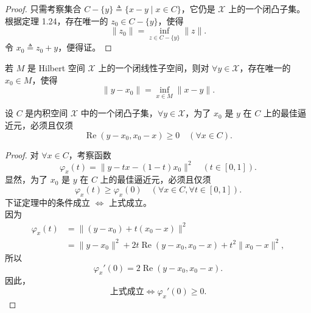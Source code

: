 \documentclass[lang=cn,newtx,10pt,scheme=chinese,thmcnt=chapter]{elegantbook}
\begin{document}
\begin{proof}
只需考察集合 ${C} - \{y\} \triangleq \{x - y \mid x \in {C}\}$，它仍是 $\mathscr{X}$ 上的一个闭凸子集。根据定理 1.24，存在唯一的 $z_0 \in {C} - \{y\}$，使得
\begin{equation*}
\|z_0\| = \inf_{z \in C  - \{y\}} \|z\|.
\end{equation*}
令 $x_0 \triangleq z_0 + y$，便得证。
\end{proof}

\begin{example}
若 $M$ 是 Hilbert 空间 $\mathscr{X}$ 上的一个闭线性子空间，则对 $\forall y \in \mathscr{X}$，存在唯一的 $x_0 \in M$，使得
\begin{equation*}
\|y - x_0\| = \inf_{x \in M} \|x - y\|.
\end{equation*}
\end{example}

\begin{theorem}
设 ${C}$ 是内积空间 $\mathscr{X}$ 中的一个闭凸子集，$\forall y \in \mathscr{X}$，为了 $x_0$ 是 $y$ 在 ${C}$ 上的最佳逼近元，必须且仅须
\begin{equation*}
\operatorname{Re}(y - x_0, x_0 - x) \geqslant 0 \quad (\forall x \in {C}).
\end{equation*}
\end{theorem}

\begin{proof}
对 $\forall x \in C$，考察函数
\begin{equation*}
\varphi_x(t) = \|y - t x - (1 - t) x_0\|^2 \quad (t \in [0, 1]).
\end{equation*}
显然，为了 $x_0$ 是 $y$ 在 $C$ 上的最佳逼近元，必须且仅须
\begin{equation*}
\varphi_x(t) \geqslant \varphi_x(0) \quad (\forall x \in C, \forall t \in [0, 1]).
\end{equation*}
下证定理中的条件成立 $\Longleftrightarrow$ 上式成立。\\
因为
\begin{equation*}
\begin{aligned}
\varphi_x(t) &= \|(y - x_0) + t (x_0 - x)\|^2 \\
&= \|y - x_0\|^2 + 2t \operatorname{Re}(y - x_0, x_0 - x) + t^2 \|x_0 - x\|^2,
\end{aligned}
\end{equation*}
所以
\begin{equation*}
\varphi_x'(0) = 2 \operatorname{Re}(y - x_0, x_0 - x).
\end{equation*}
因此，
\begin{equation*}
\text{上式成立} \Longleftrightarrow \varphi_x'(0) \geqslant 0.
\end{equation*}
\end{proof}
\end{document}
